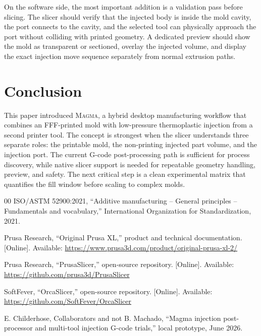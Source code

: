 \documentclass[conference]{IEEEtran}
\newcommand{\magma}{\textsc{Magma}}
\begin{document}
On the software side, the most important addition is a validation pass before slicing. The slicer should verify that the injected body is inside the mold cavity, the port connects to the cavity, and the selected tool can physically approach the port without colliding with printed geometry. A dedicated preview should show the mold as transparent or sectioned, overlay the injected volume, and display the exact injection move sequence separately from normal extrusion paths.

\section{Conclusion}
This paper introduced \magma, a hybrid desktop manufacturing workflow that combines an FFF-printed mold with low-pressure thermoplastic injection from a second printer tool. The concept is strongest when the slicer understands three separate roles: the printable mold, the non-printing injected part volume, and the injection port. The current G-code post-processing path is sufficient for process discovery, while native slicer support is needed for repeatable geometry handling, preview, and safety. The next critical step is a clean experimental matrix that quantifies the fill window before scaling to complex molds.

\balance
\begin{thebibliography}{00}
ISO/ASTM 52900:2021, ``Additive manufacturing -- General principles -- Fundamentals and vocabulary,'' International Organization for Standardization, 2021.

Prusa Research, ``Original Prusa XL,'' product and technical documentation. [Online]. Available: \url{https://www.prusa3d.com/product/original-prusa-xl-2/}

Prusa Research, ``PrusaSlicer,'' open-source repository. [Online]. Available: \url{https://github.com/prusa3d/PrusaSlicer}

SoftFever, ``OrcaSlicer,'' open-source repository. [Online]. Available: \url{https://github.com/SoftFever/OrcaSlicer}

E. Childerhose, Collaborators and not B. Machado, ``Magma injection post-processor and multi-tool injection G-code trials,'' local prototype, June 2026.
\end{thebibliography}
\end{document}

